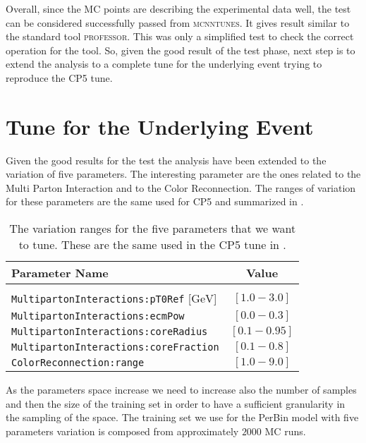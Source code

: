 Overall, since the MC points are describing the experimental data well, the test can be considered successfully passed from \textsc{mcnntunes}. It gives result similar to the standard tool \textsc{professor}. This was only a simplified test to check the correct operation for the tool. So, given  the good result of the test phase, next step is to extend the analysis to a complete tune for the underlying event trying to reproduce the CP5 tune.




\section{Tune for the Underlying Event}

Given the good results for the test the analysis have been extended to the variation of five parameters. The interesting  parameter are the ones related to the Multi Parton Interaction and to the Color Reconnection. The ranges of variation for these parameters are the same used for CP5 and summarized in .

\begin{table}[!htb]
\centering
\begin{tabular}{l | c }
Parameter Name & Value \\ 
\hline \hline
\\[-0.85em]
	\texttt{MultipartonInteractions:pT0Ref} [$\mathrm{GeV}$] & $[1.0 - 3.0]$\\[2pt]
	\texttt{MultipartonInteractions:ecmPow} & $[0.0 - 0.3]$\\[2pt]
	\texttt{MultipartonInteractions:coreRadius} & $[0.1 - 0.95 ]$\\[2pt]
	\texttt{MultipartonInteractions:coreFraction} & $[ 0.1 - 0.8 ]$\\[2pt]
	\texttt{ColorReconnection:range} & $[  1.0 - 9.0 ]$
\end{tabular}
\caption{The variation ranges for the five parameters that we want to tune. These are the same used in the CP5 tune in \cite{CPtunes}.}
\label{table:ranges5params}
\end{table}

\noindent As the parameters space increase we need to increase also the number of samples and then the size of the training set in order to have a sufficient granularity in the sampling of the space. 
The training set we use for the PerBin model with five parameters variation is composed from approximately $2000$ MC runs. 

